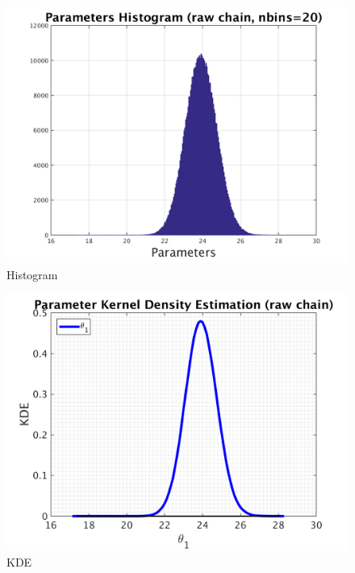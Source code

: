 \begin{figure}[H]
  
  \centering
   \includegraphics[scale=0.75]{100_results/outputData_50/simple_ip_hist_raw}
   \caption{Histogram}
\end{figure}



\begin{figure}[H]
  
  \centering
   \includegraphics[scale=0.75]{100_results/outputData_50/simple_ip_kde_raw}
   \caption{ KDE }
\end{figure}

